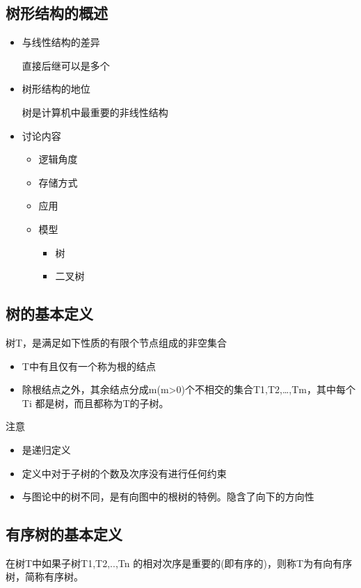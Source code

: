 \documentclass[AutoFakeBold]{LZUThesis2007}
\begin{document}
		\subsection{树形结构的概述}
			\begin{itemize}
				\item 与线性结构的差异
				
				直接后继可以是多个
				\item 树形结构的地位

				树是计算机中最重要的非线性结构
				\item 讨论内容
					\begin{itemize}
						\item 逻辑角度
						\item 存储方式
						\item 应用
						\item 模型
						\begin{itemize}
							\item 树
							\item 二叉树
						\end{itemize}
					
					\end{itemize}

			\end{itemize}

		\subsection{树的基本定义}
		树T，是满足如下性质的有限个节点组成的非空集合
			\begin{itemize}
				\item T中有且仅有一个称为根的结点
				\item 除根结点之外，其余结点分成m(m>0)个不相交的集合T1,T2,…,Tm，其中每个Ti 都是树，而且都称为T的子树。
			
			\end{itemize}
		注意
\begin{itemize}
	\item 是递归定义
	\item 定义中对于子树的个数及次序没有进行任何约束
	\item 与图论中的树不同，是有向图中的根树的特例。隐含了向下的方向性

\end{itemize}

		\subsection{有序树的基本定义}
		在树T中如果子树T1,T2,..,Tn 的相对次序是重要的(即有序的)，则称T为有向有序树，简称有序树。
\end{document}

